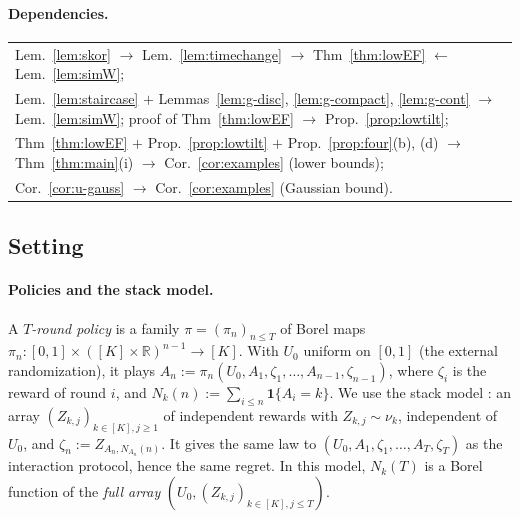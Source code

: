 \documentclass[11pt]{article}
\newcommand{\dt}[1]{\hypertarget{#1}{}}
\newcommand{\R}{\mathbb{R}}
\newcommand{\1}{\mathbf{1}}
\begin{document}
\paragraph{Dependencies.}
\begin{center}\small
\begin{tabular}{l}
Lem.~\ref{lem:skor} $\to$ Lem.~\ref{lem:timechange} $\to$ Thm~\ref{thm:lowEF} $\leftarrow$ Lem.~\ref{lem:simW};\\[1mm]
Lem.~\ref{lem:staircase} $+$ Lemmas~\ref{lem:g-disc}, \ref{lem:g-compact}, \ref{lem:g-cont} $\to$ Lem.~\ref{lem:simW};\quad
proof of Thm~\ref{thm:lowEF} $\to$ Prop.~\ref{prop:lowtilt};\\[1mm]
Thm~\ref{thm:lowEF} $+$ Prop.~\ref{prop:lowtilt} $+$ Prop.~\ref{prop:four}(b), (d) $\to$ Thm~\ref{thm:main}(i) $\to$ Cor.~\ref{cor:examples} (lower bounds);\\[1mm]
Cor.~\ref{cor:u-gauss} $\to$ Cor.~\ref{cor:examples} (Gaussian bound).
\end{tabular}
\end{center}

\subsection{Setting}\label{sec:app-low-setting}

\paragraph{Policies and the stack model.}\dt{l:stack} A \emph{$T$-round policy} is a family $\pi=(\pi_n)_{n\le T}$ of Borel maps
$\pi_n:[0,1]\times([K]\times\R)^{n-1}\to[K]$. With $U_0$ uniform on $[0,1]$ (the external randomization), it plays $A_n:=\pi_n(U_0,A_1,\zeta_1,\dots,A_{n-1},\zeta_{n-1})$,
where $\zeta_i$ is the reward of round $i$, and $N_k(n):=\sum_{i\le n}\1\{A_i=k\}$. We use the stack model \citep[Section~4.6]{LS}: an array $(Z_{k,j})_{k\in[K],j\ge1}$ of
independent rewards with $Z_{k,j}\sim\nu_k$, independent of $U_0$, and $\zeta_n:=Z_{A_n,N_{A_n}(n)}$. It gives the same law to $(U_0,A_1,\zeta_1,\dots,A_T,\zeta_T)$ as the
interaction protocol, hence the same regret. In this model, $N_k(T)$ is a Borel function of the \emph{full array} $(U_0,(Z_{k,j})_{k\in[K],j\le T})$.
\end{document}
